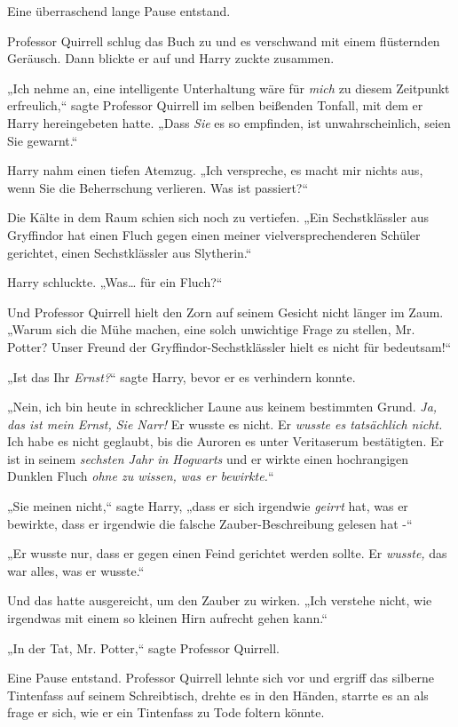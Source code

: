 {Eine überraschend lange Pause entstand.

Professor Quirrell schlug das Buch zu und es verschwand mit einem flüsternden Geräusch. Dann blickte er auf und Harry zuckte zusammen.

„Ich nehme an, eine intelligente Unterhaltung wäre für \emph{mich} zu diesem Zeitpunkt erfreulich,“ sagte Professor Quirrell im selben beißenden Tonfall, mit dem er Harry hereingebeten hatte. „Dass \emph{Sie} es so empfinden, ist unwahrscheinlich, seien Sie gewarnt.“

Harry nahm einen tiefen Atemzug. „Ich verspreche, es macht mir nichts aus, wenn Sie die Beherrschung verlieren. Was ist passiert?“

Die Kälte in dem Raum schien sich noch zu vertiefen. „Ein Sechstklässler aus Gryffindor hat einen Fluch gegen einen meiner vielversprechenderen Schüler gerichtet, einen Sechstklässler aus Slytherin.“

Harry schluckte. „Was… für ein Fluch?“

Und Professor Quirrell hielt den Zorn auf seinem Gesicht nicht länger im Zaum. „Warum sich die Mühe machen, eine solch unwichtige Frage zu stellen, Mr. Potter? Unser Freund der Gryffindor-Sechstklässler hielt es nicht für bedeutsam!“

„Ist das Ihr \emph{Ernst?}“ sagte Harry, bevor er es verhindern konnte.

„Nein, ich bin heute in schrecklicher Laune aus keinem bestimmten Grund. \emph{Ja, das ist mein Ernst, Sie Narr!} Er wusste es nicht. Er \emph{wusste es tatsächlich nicht.} Ich habe es nicht geglaubt, bis die Auroren es unter Veritaserum bestätigten. Er ist in seinem \emph{sechsten Jahr in Hogwarts} und er wirkte einen hochrangigen Dunklen Fluch \emph{ohne zu wissen, was er bewirkte.}“

„Sie meinen nicht,“ sagte Harry, „dass er sich irgendwie \emph{geirrt} hat, was er bewirkte, dass er irgendwie die falsche Zauber-Beschreibung gelesen hat -“

„Er wusste nur, dass er gegen einen Feind gerichtet werden sollte. Er \emph{wusste,} das war alles, was er wusste.“

Und das hatte ausgereicht, um den Zauber zu wirken. „Ich verstehe nicht, wie irgendwas mit einem so kleinen Hirn aufrecht gehen kann.“

„In der Tat, Mr. Potter,“ sagte Professor Quirrell.

Eine Pause entstand. Professor Quirrell lehnte sich vor und ergriff das silberne Tintenfass auf seinem Schreibtisch, drehte es in den Händen, starrte es an als frage er sich, wie er ein Tintenfass zu Tode foltern könnte.

}
